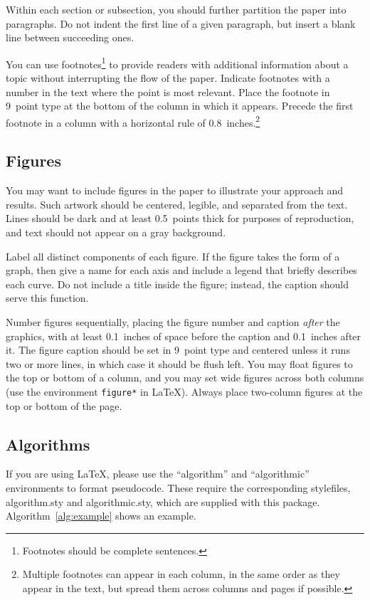 \documentclass{article}
\begin{document}
Within each section or subsection, you should further partition the
paper into paragraphs. Do not indent the first line of a given
paragraph, but insert a blank line between succeeding ones.

You can use footnotes\footnote{Footnotes
should be complete sentences.} to provide readers with additional
information about a topic without interrupting the flow of the paper.
Indicate footnotes with a number in the text where the point is most
relevant. Place the footnote in 9~point type at the bottom of the
column in which it appears. Precede the first footnote in a column
with a horizontal rule of 0.8~inches.\footnote{Multiple footnotes can
appear in each column, in the same order as they appear in the text,
but spread them across columns and pages if possible.}

\subsection{Figures}

You may want to include figures in the paper to illustrate
your approach and results. Such artwork should be centered,
legible, and separated from the text. Lines should be dark and at
least 0.5~points thick for purposes of reproduction, and text should
not appear on a gray background.

Label all distinct components of each figure. If the figure takes the
form of a graph, then give a name for each axis and include a legend
that briefly describes each curve. Do not include a title inside the
figure; instead, the caption should serve this function.

Number figures sequentially, placing the figure number and caption
\emph{after} the graphics, with at least 0.1~inches of space before
the caption and 0.1~inches after it. The figure caption should be set in
9~point type and centered unless it runs two or more lines, in which
case it should be flush left. You may float figures to the top or
bottom of a column, and you may set wide figures across both columns
(use the environment \texttt{figure*} in \LaTeX). Always place
two-column figures at the top or bottom of the page.

\subsection{Algorithms}

If you are using \LaTeX, please use the ``algorithm'' and ``algorithmic''
environments to format pseudocode. These require
the corresponding stylefiles, algorithm.sty and
algorithmic.sty, which are supplied with this package.
Algorithm~\ref{alg:example} shows an example.
\end{document}
